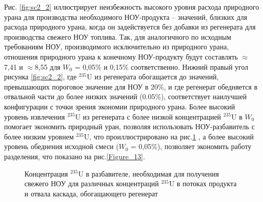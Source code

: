Рис. \ref{fig:sc2_2} иллюстрирует неизбежность высокого уровня расхода природного урана для производства необходимого НОУ-продукта  -- значений, близких для расхода природного урана, когда он задействуется без добавки из регенерата для производства свежего НОУ топлива. Так, для аналогичного по исходным требованиям НОУ, производимого исключительно из природного урана, отношения природного урана к конечному НОУ-продукту будут составлять $\approx$7,41 и $\approx$8,55 для $W_0$ = 0,05\% и 0,15\% соответственно. Нижний правый угол рисунка \ref{fig:sc2_2}, где $^{235}$U из регенерата обогащается до значений, превышающих пороговое значение для НОУ в 20\%, и где регенерат обедняется в отвальной части до более низких значений (0.05\%), соответствует наилучшей конфигурации с точки зрения экономии природного урана. Более высокий уровень извлечения $^{235}$U из регенерата с более низкой концентрацией $^{235}$U в $W_0$ помогает экономить природный уран, позволяя использовать НОУ-разбавитель с более низким уровнем $^{235}$U, что проиллюстрировано на рис.\ref{fig:sc2_LEU_D} , а более высокий уровень обеднения исходной смеси ($W_0$ = 0,05\%), позволяет экономить  работу разделения, что показано на рис.\ref{Figure_13}.

\begin{figure}[ht]
  \caption{Концентрация $^{235}$U в разбавителе, необходимая для получения свежего НОУ для различных концентраций $^{235}$U в потоках продукта и отвала каскада, обогащающего регенерат}\label{fig:sc2_LEU_D}
\end{figure}

